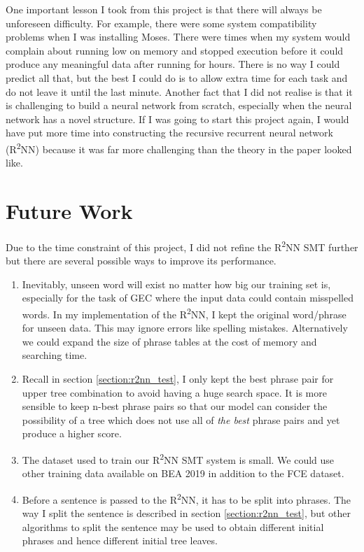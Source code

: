 \documentclass[12pt,a4paper,twoside,openright]{report}
\begin{document}
One important lesson I took from this project is that there will always be unforeseen difficulty. For example, there were some system compatibility problems when I was installing Moses. There were times when my system would complain about running low on memory and stopped execution before it could produce any meaningful data after running for hours. There is no way I could predict all that, but the best I could do is to allow extra time for each task and do not leave it until the last minute. Another fact that I did not realise is that it is challenging to build a neural network from scratch, especially when the neural network has a novel structure. If I was going to start this project again, I would have put more time into constructing the recursive recurrent neural network (R\textsuperscript{2}NN) because it was far more challenging than the theory in the paper\cite{r2nn} looked like.

\section{Future Work}
Due to the time constraint of this project, I did not refine the R\textsuperscript{2}NN SMT further but there are several possible ways to improve its performance.

\begin{enumerate}
    \item Inevitably, unseen word will exist no matter how big our training set is, especially for the task of GEC where the input data could contain misspelled words. In my implementation of the R\textsuperscript{2}NN, I kept the original word/phrase for unseen data. This may ignore errors like spelling mistakes. Alternatively we could expand the size of phrase tables at the cost of memory and searching time.
    
    \item Recall in section \ref{section:r2nn_test}, I only kept the best phrase pair for upper tree combination to avoid having a huge search space. It is more sensible to keep n-best phrase pairs so that our model can consider the possibility of a tree which does not use all of \textit{the best} phrase pairs and yet produce a higher score.
    
    \item The dataset used to train our R\textsuperscript{2}NN SMT system is small. We could use other training data available on BEA 2019\cite{bryant-etal-2019-bea} in addition to the FCE dataset.
    
    \item Before a sentence is passed to the R\textsuperscript{2}NN, it has to be split into phrases. The way I split the sentence is described in section \ref{section:r2nn_test}, but other algorithms to split the sentence may be used to obtain different initial phrases and hence different initial tree leaves.
\end{enumerate}
\end{document}
